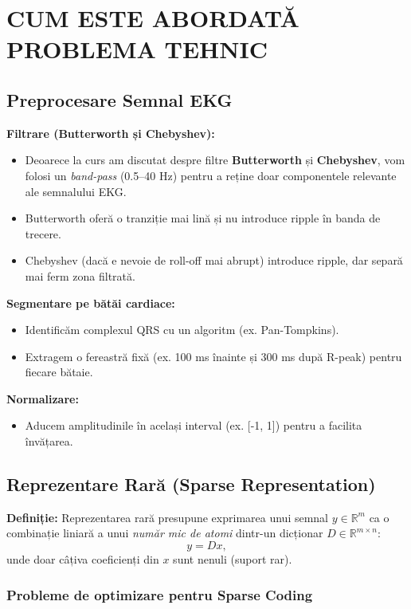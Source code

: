 \documentclass[12pt]{article}  %
\begin{document}
\section{CUM ESTE ABORDATĂ PROBLEMA TEHNIC}

\subsection{Preprocesare Semnal EKG}

\textbf{Filtrare (Butterworth și Chebyshev):}
\begin{itemize}
    \item Deoarece la curs am discutat despre filtre \textbf{Butterworth} și \textbf{Chebyshev}, vom folosi un \emph{band-pass} (0.5--40 Hz) pentru a reține doar componentele relevante ale semnalului EKG.
    \item Butterworth oferă o tranziție mai lină și nu introduce ripple în banda de trecere.
    \item Chebyshev (dacă e nevoie de roll-off mai abrupt) introduce ripple, dar separă mai ferm zona filtrată.
\end{itemize}

\textbf{Segmentare pe bătăi cardiace:}
\begin{itemize}
    \item Identificăm complexul QRS cu un algoritm (ex. Pan-Tompkins).
    \item Extragem o fereastră fixă (ex. 100 ms înainte și 300 ms după R-peak) pentru fiecare bătaie.
\end{itemize}

\textbf{Normalizare:}
\begin{itemize}
    \item Aducem amplitudinile în același interval (ex. [-1, 1]) pentru a facilita învățarea.
\end{itemize}

\subsection{Reprezentare Rară (Sparse Representation)}

\textbf{Definiție:}  
Reprezentarea rară presupune exprimarea unui semnal \( y \in \mathbb{R}^m \) ca o combinație liniară a unui \emph{număr mic de atomi} dintr-un dicționar \( D \in \mathbb{R}^{m \times n} \):
\[
y = D x,
\]
unde doar câțiva coeficienți din \( x \) sunt nenuli (suport rar).

\subsubsection*{Probleme de optimizare pentru Sparse Coding}
\end{document}
